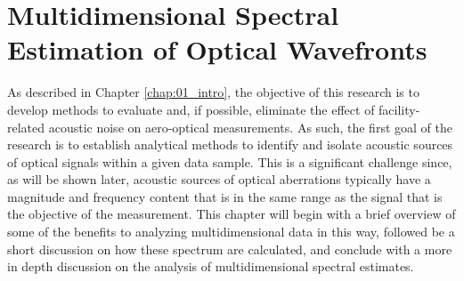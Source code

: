 
\chapter{Multidimensional Spectral Estimation of Optical Wavefronts}
\label{chap:04_dispersion}

As described in Chapter \ref{chap:01_intro}, the objective of this research is to develop methods to evaluate and, if possible, eliminate the effect of facility-related acoustic noise on aero-optical measurements.
As such, the first goal of the research is to establish analytical methods to identify and isolate acoustic sources of optical signals within a given data sample.
This is a significant challenge since, as will be shown later, acoustic sources of optical aberrations typically have a magnitude and frequency content that is in the same range as the signal that is the objective of the measurement.
This chapter will begin with a brief overview of some of the benefits to analyzing multidimensional data in this way, followed be a short discussion on how these spectrum are calculated, and conclude with a more in depth discussion on the analysis of multidimensional spectral estimates.


